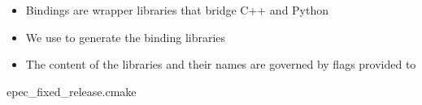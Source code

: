 \begin{frame}[fragile]
  \frametitle{\cmake}
  \begin{itemize}
  \item Bindings are wrapper libraries that bridge C++ and Python
  \item We use \cmake{} to generate the binding libraries
  \item The content of the libraries and their names are governed by flags
    provided to 
  \end{itemize}

  \def\filename{epec_fixed_release.cmake}%
  
                  {\cmakeDir\filename}
\end{frame}
